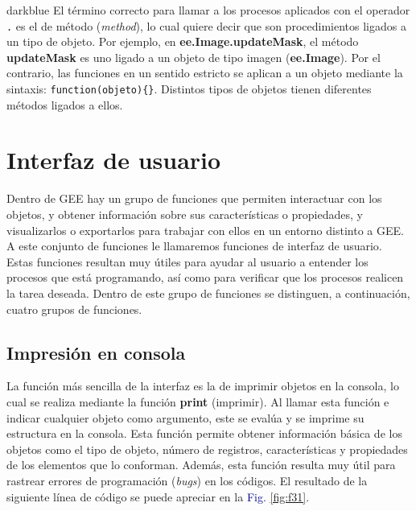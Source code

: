 \documentclass[
  12pt,
  letterpaper,
  twoside]{book}
\newcommand\boldpurple[1]{\textcolor{darkpurple}{\textbf{#1}}}
\begin{document}
\begin{bluebox2}

\begin{awesomeblock}{5pt}{\faLightbulb}{darkblue}
El término correcto para llamar a los procesos aplicados con el operador \texttt{.} es el de método (\emph{method}), lo cual quiere decir que son procedimientos ligados a un tipo de objeto. Por ejemplo, en \boldpurple{ee.Image.updateMask}, el método \boldpurple{updateMask} es uno ligado a un objeto de tipo imagen (\boldpurple{ee.Image}). Por el contrario, las funciones en un sentido estricto se aplican a un objeto mediante la sintaxis: \texttt{function(objeto)\{\}}. Distintos tipos de objetos tienen diferentes métodos ligados a ellos.

\end{awesomeblock}

\end{bluebox2}

\newpage

\hypertarget{interfaz-de-usuario}{%
\chapter{Interfaz de usuario}\label{interfaz-de-usuario}}

Dentro de GEE hay un grupo de funciones que permiten interactuar con los objetos, y obtener información sobre sus características o propiedades, y visualizarlos o exportarlos para trabajar con ellos en un entorno distinto a GEE. A este conjunto de funciones le llamaremos funciones de interfaz de usuario. Estas funciones resultan muy útiles para ayudar al usuario a entender los procesos que está programando, así como para verificar que los procesos realicen la tarea deseada. Dentro de este grupo de funciones se distinguen, a continuación, cuatro grupos de funciones.

\hypertarget{impresiuxf3n-en-consola}{%
\section{Impresión en consola}\label{impresiuxf3n-en-consola}}

La función más sencilla de la interfaz es la de imprimir objetos en la consola, lo cual se realiza mediante la función \boldpurple{print} (imprimir). Al llamar esta función e indicar cualquier objeto como argumento, este se evalúa y se imprime su estructura en la consola. Esta función permite obtener información básica de los objetos como el tipo de objeto, número de registros, características y propiedades de los elementos que lo conforman. Además, esta función resulta muy útil para rastrear errores de programación (\emph{bugs}) en los códigos. El resultado de la siguiente línea de código se puede apreciar en la \textcolor{darkblue}{Fig.} \ref{fig:f31}.
\end{document}
